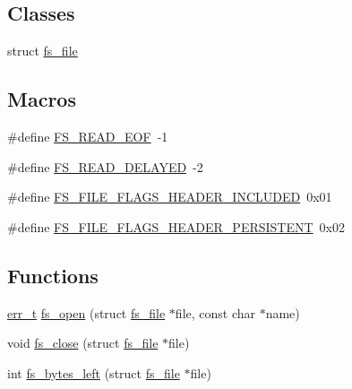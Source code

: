 \subsection*{Classes}
\begin{DoxyCompactItemize}
\item 
struct \hyperlink{structfs__file}{fs\+\_\+file}
\end{DoxyCompactItemize}
\subsection*{Macros}
\begin{DoxyCompactItemize}
\item 
\#define \hyperlink{openmote-cc2538_2lwip_2src_2include_2lwip_2apps_2fs_8h_a05d23b3c867c1f9d701efa0d6d0db92d}{F\+S\+\_\+\+R\+E\+A\+D\+\_\+\+E\+OF}~-\/1
\item 
\#define \hyperlink{openmote-cc2538_2lwip_2src_2include_2lwip_2apps_2fs_8h_a3f90d15249e0bc12ed287140356f71dc}{F\+S\+\_\+\+R\+E\+A\+D\+\_\+\+D\+E\+L\+A\+Y\+ED}~-\/2
\item 
\#define \hyperlink{openmote-cc2538_2lwip_2src_2include_2lwip_2apps_2fs_8h_a7e36694e0257a7642d41ffda5bf03634}{F\+S\+\_\+\+F\+I\+L\+E\+\_\+\+F\+L\+A\+G\+S\+\_\+\+H\+E\+A\+D\+E\+R\+\_\+\+I\+N\+C\+L\+U\+D\+ED}~0x01
\item 
\#define \hyperlink{openmote-cc2538_2lwip_2src_2include_2lwip_2apps_2fs_8h_a95e84b4ba432cf58a59f14ba85733584}{F\+S\+\_\+\+F\+I\+L\+E\+\_\+\+F\+L\+A\+G\+S\+\_\+\+H\+E\+A\+D\+E\+R\+\_\+\+P\+E\+R\+S\+I\+S\+T\+E\+NT}~0x02
\end{DoxyCompactItemize}
\subsection*{Functions}
\begin{DoxyCompactItemize}
\item 
\hyperlink{group__infrastructure__errors_gaf02d9da80fd66b4f986d2c53d7231ddb}{err\+\_\+t} \hyperlink{openmote-cc2538_2lwip_2src_2include_2lwip_2apps_2fs_8h_a594058d3f4dd9f333c51b7e5ca910ac3}{fs\+\_\+open} (struct \hyperlink{structfs__file}{fs\+\_\+file} $\ast$file, const char $\ast$name)
\item 
void \hyperlink{openmote-cc2538_2lwip_2src_2include_2lwip_2apps_2fs_8h_a742b1911f18d0c780436b7a6abb08c70}{fs\+\_\+close} (struct \hyperlink{structfs__file}{fs\+\_\+file} $\ast$file)
\item 
int \hyperlink{openmote-cc2538_2lwip_2src_2include_2lwip_2apps_2fs_8h_a3a7ab7c6c0ddd559030d8e91d94ea02b}{fs\+\_\+bytes\+\_\+left} (struct \hyperlink{structfs__file}{fs\+\_\+file} $\ast$file)
\end{DoxyCompactItemize}


